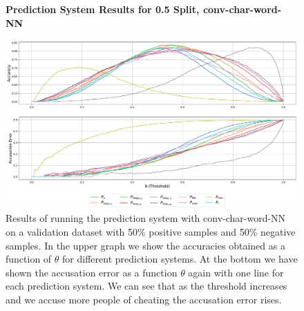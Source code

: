 \begin{figure}
    \centering
    \textbf{Prediction System Results for 0.5 Split, \gls{conv-char-word-NN}}\par\medskip
    \includegraphics[scale=0.33]{./pictures/experiments/conv_char_word_nn/prediction_system_50}
    \caption{Results of running the prediction system with
        \gls{conv-char-word-NN} on a validation dataset with 50\% positive
        samples and 50\% negative samples. In the upper graph we show the
        accuracies obtained as a function of $\theta$ for different prediction
        systems. At the bottom we have shown the accusation error as a function
        $\theta$ again with one line for each prediction system. We can see that
        as the threshold increases and we accuse more people of cheating the
        accusation error rises.}
    \label{fig:conv-char-word-NN-pred-50}
\end{figure}

